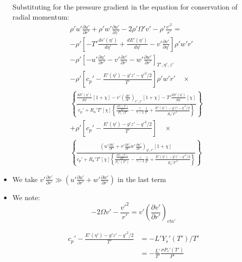 \documentclass[preprint, prX]{revtex4}
\newcommand{\gogmo}{\frac{\gamma}{\gamma-1}}
\newcommand{\dd}[2]{\frac{d#1}{d#2}}
\newcommand{\pd}[2]{\frac{\partial#1}{\partial#2}}
\newcommand{\tpd}[3]{\left( \frac{\partial#1}{\partial#2} \right)_{#3}}
\begin{document}
\begin{itemize}
Substituting for the pressure gradient in the equation for conservation of radial momentum:
\begin{equation}
\begin{split}
&\rho'u'\pd{u'}{r'} + \rho' w' \pd{u'}{z'} - 2 \rho' \Omega'v' - \rho'\frac{v'^2}{r'} = \\
&-\rho'\left[ -T' \dd{s'(\eta')}{\eta'} +\dd{E'(\eta')}{\eta'}- v' \pd{v'}{\eta'} \right] \rho' w' r' \\
& - \rho' \left[ -u'\pd{u'}{r'} -v'\pd{v'}{r'} -w'\pd{w'}{r'}\right]_{T',\eta',z'} \\
& - \rho' \left[ c_p' - \frac{E'(\eta') - g'z' - q'^2/2}{T'}\right]\rho' w' r' \quad \times \\
&\left\{ \frac{\dd{E'(\eta')}{\eta'}\left[ 1+\chi\right] - v'\tpd{v'}{r'}{r',z'}\left[ 1 + \chi \right] - T' \dd{S'(\eta')}{\eta'}[\chi]}{c_p'+R_a'T'[\chi] \left\{ \frac{\dd{P_s'(T')}{T'}}{P_s'(T'} -\gogmo \frac{1}{T'} + \frac{E'(\eta') - g'z' - q'^2/2}{R_a'T'^2} \right\} }\right\} \\
&+ \rho' \left[ c_p' - \frac{E'(\eta') - g'z'-q'^2/2}{T'}\right] \quad \times \\
& \left\{ \frac{ \left( u'\pd{u'}{r'} +v'\pd{v'}{r'} w'\pd{w'}{r'} \right)_{\eta',r'} [1+\chi] }{c_p' + R_a'T'[\chi] \left\{ \frac{\dd{P_s'(T')}{T'}}{P_s'(T')} -\gogmo \frac{1}{T'} + \frac{E'(\eta') - g'z' - q'^2/2}{R_a'T'^2}\right \} }	\right\}
\end{split}
\end{equation}

\item
We take $v'\pd{v'}{r'} \gg \left( u' \pd{u'}{r'} + w'\pd{w'}{r'}\right)$ in the last term

\item
We note:
\begin{equation}
-2 \Omega v' - \frac{v'^2}{r'} = v'\tpd{v'}{r'}{eta'}
\end{equation}

\begin{equation}
\begin{split}
c_p' - \frac{E'(\eta') - g' z' - q'^2/2}{T'} &= -L' Y_s'(T')/T' \\
&= -\frac{L'}{T'}\frac{\sigma P_s'(T')}{P'}
\end{split}
\end{equation}


\end{itemize}
\end{document}

